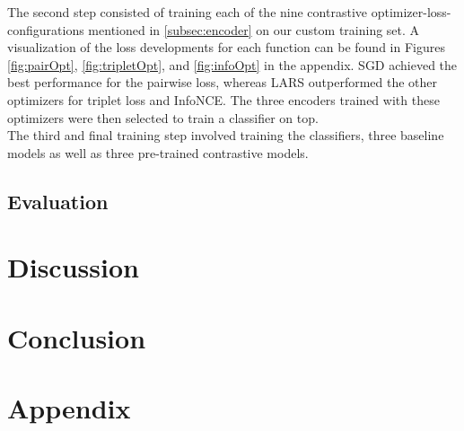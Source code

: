 \documentclass[11pt]{article}
\begin{document}
The second step consisted of training each of the nine contrastive optimizer-loss-configurations mentioned in \ref{subsec:encoder} on our custom training set.
A visualization of the loss developments for each function can be found in Figures \ref{fig:pairOpt}, \ref{fig:tripletOpt}, and \ref{fig:infoOpt} in the appendix.
SGD achieved the best performance for the pairwise loss, whereas LARS outperformed the other optimizers for triplet loss and InfoNCE. %
The three encoders trained with these optimizers were then selected to train a classifier on top.\\
The third and final training step involved training the classifiers, three baseline models as well as three pre-trained contrastive models.

\subsection{Evaluation}



\section{Discussion}
\label{sec:discussion}

\section{Conclusion}
\label{sec:conclusion}








\appendix
\section{Appendix}
\label{sec:appendix}
\end{document}
